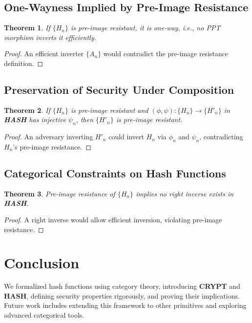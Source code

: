 \documentclass{article}
\theoremstyle{plain}
\newtheorem{theorem}{Theorem}
\begin{document}
\subsection{One-Wayness Implied by Pre-Image Resistance}
\begin{theorem}
If \( \{ H_n \} \) is pre-image resistant, it is one-way, i.e., no PPT morphism inverts it efficiently.
\end{theorem}
\begin{proof}
An efficient inverter \( \{ A_n \} \) would contradict the pre-image resistance definition.
\end{proof}

\subsection{Preservation of Security Under Composition}
\begin{theorem}
If \( \{ H_n \} \) is pre-image resistant and \( (\phi, \psi) : \{ H_n \} \to \{ H'_n \} \) in \textbf{HASH} has injective \( \psi_n \), then \( \{ H'_n \} \) is pre-image resistant.
\end{theorem}
\begin{proof}
An adversary inverting \( H'_n \) could invert \( H_n \) via \( \phi_n \) and \( \psi_n \), contradicting \( H_n \)’s pre-image resistance.
\end{proof}

\subsection{Categorical Constraints on Hash Functions}
\begin{theorem}
Pre-image resistance of \( \{ H_n \} \) implies no right inverse exists in \textbf{HASH}.
\end{theorem}
\begin{proof}
A right inverse would allow efficient inversion, violating pre-image resistance.
\end{proof}

\section{Conclusion}
We formalized hash functions using category theory, introducing \textbf{CRYPT} and \textbf{HASH}, defining security properties rigorously, and proving their implications. Future work includes extending this framework to other primitives and exploring advanced categorical tools.
\end{document}
